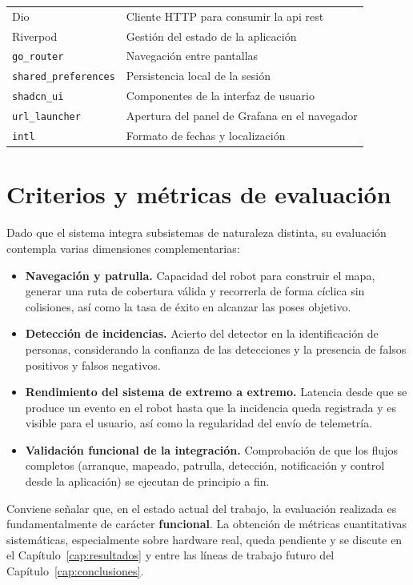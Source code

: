 \begin{table}[htbp]
\begin{tabular}{@{}lp{9cm}@{}}
    Dio & Cliente HTTP para consumir la \gls{api} \gls{rest} \\
    Riverpod & Gestión del estado de la aplicación \\
    \texttt{go\_router} & Navegación entre pantallas \\
    \texttt{shared\_preferences} & Persistencia local de la sesión \\
    \texttt{shadcn\_ui} & Componentes de la interfaz de usuario \\
    \texttt{url\_launcher} & Apertura del panel de Grafana en el navegador \\
    \texttt{intl} & Formato de fechas y localización \\
    \bottomrule
  \end{tabular}
\end{table}

\FloatBarrier

\section{Criterios y métricas de evaluación}
\label{sec:metricas}

Dado que el sistema integra subsistemas de naturaleza distinta, su evaluación
contempla varias dimensiones complementarias:

\begin{itemize}
  \item \textbf{Navegación y patrulla.} Capacidad del robot para construir el
    mapa, generar una ruta de cobertura válida y recorrerla de forma cíclica sin
    colisiones, así como la tasa de éxito en alcanzar las poses objetivo.

  \item \textbf{Detección de incidencias.} Acierto del detector en la
    identificación de personas, considerando la confianza de las detecciones y
    la presencia de falsos positivos y falsos negativos.

  \item \textbf{Rendimiento del sistema de extremo a extremo.} Latencia desde
    que se produce un evento en el robot hasta que la incidencia queda
    registrada y es visible para el usuario, así como la regularidad del envío de
    telemetría.

  \item \textbf{Validación funcional de la integración.} Comprobación de que los
    flujos completos (arranque, mapeado, patrulla, detección, notificación y
    control desde la aplicación) se ejecutan de principio a fin.
\end{itemize}

Conviene señalar que, en el estado actual del trabajo, la evaluación realizada es
fundamentalmente de carácter \textbf{funcional}. La obtención de métricas
cuantitativas sistemáticas, especialmente sobre hardware real, queda pendiente y
se discute en el Capítulo~\ref{cap:resultados} y entre las líneas de trabajo
futuro del Capítulo~\ref{cap:conclusiones}.

